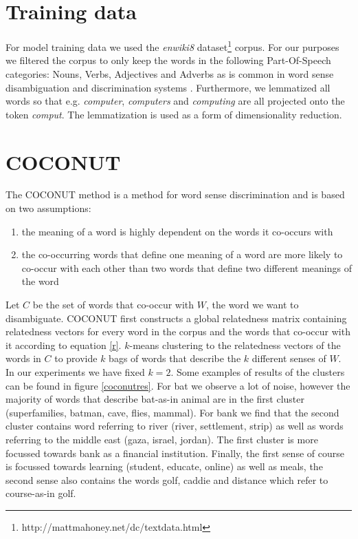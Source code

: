 \documentclass[11pt]{article}
\begin{document}
\section{Training data}
For model training data we used the \textit{enwiki8} dataset\footnote{http://mattmahoney.net/dc/textdata.html} corpus. For our purposes we filtered the corpus to only keep the words in the following Part-Of-Speech categories: Nouns, Verbs, Adjectives and Adverbs as is common in word sense disambiguation and discrimination systems \cite{survey}. Furthermore, we lemmatized all words so that e.g. \textit{computer}, \textit{computers} and \textit{computing} are all projected onto the token \textit{comput}. The lemmatization is used as a form of dimensionality reduction.

\section{COCONUT}
\label{coconut}
The COCONUT method is a method for word sense discrimination and is based on two assumptions:
\begin{enumerate}
\item the meaning of a word is highly dependent on the words it co-occurs with
\item the co-occurring words that define one meaning of a word are more likely to co-occur with each other than two words that define two different meanings of the word
\end{enumerate}
Let $C$ be the set of words that co-occur with $W$, the word we want to disambiguate. COCONUT first constructs a global relatedness matrix containing relatedness vectors for every word in the corpus and the words that co-occur with it according to equation \ref{r}. $k$-means clustering to the relatedness vectors of the words in $C$ to provide $k$ bags of words that describe the $k$ different senses of $W$. In our experiments we have fixed $k=2$. Some examples of results of the clusters can be found in figure \ref{coconutres}. For bat we observe a lot of noise, however the majority of words that describe bat-as-in animal are in the first cluster (superfamilies, batman, cave, flies, mammal). For bank we find that the second cluster contains word referring to river (river, settlement, strip) as well as words referring to the middle east (gaza, israel, jordan). The first cluster is more focussed towards bank as a financial institution. Finally, the first sense of course is focussed towards learning (student, educate, online) as well as meals, the second sense also contains the words golf, caddie and distance which refer to course-as-in golf. 
\end{document}
